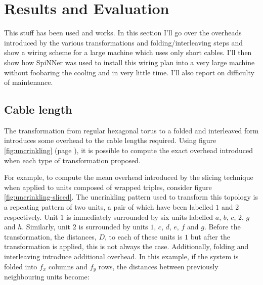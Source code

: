 	\section{Results and Evaluation}
		
		This stuff has been used and works. In this section I'll go over the
		overheads introduced by the various transformations and
		folding/interleaving steps and show a wiring scheme for a large machine
		which uses only short cables. I'll then show how SpiNNer was used to
		install this wiring plan into a very large machine without foobaring the
		cooling and in very little time. I'll also report on difficulty of
		maintenance.
		
		\subsection{Cable length}
			
			The transformation from regular hexagonal torus to a folded and
			interleaved form introduces some overhead to the cable lengths required.
			Using figure \ref{fig:uncrinkling} (page \pageref{fig:uncrinkling}), it
			is possible to compute the exact overhead introduced when each type of
			transformation proposed.
			
			For example, to compute the mean overhead introduced by the slicing
			technique when applied to units composed of wrapped triples, consider
			figure \ref{fig:uncrinkling-sliced}. The uncrinkling pattern used to
			transform this topology is a repeating pattern of two units, a pair of
			which have been labelled $1$ and $2$ respectively. Unit $1$ is
			immediately surrounded by six units labelled $a$, $b$, $c$, $2$, $g$ and
			$h$. Similarly, unit $2$ is surrounded by units $1$, $c$, $d$, $e$, $f$
			and $g$. Before the transformation, the distances, $D$, to each of these
			units is $1$ but after the transformation is applied, this is not always
			the case. Additionally, folding and interleaving introduce additional
			overhead. In this example, if the system is folded into $f_x$ columns and
			$f_y$ rows, the distances between previously neighbouring units become:
			
